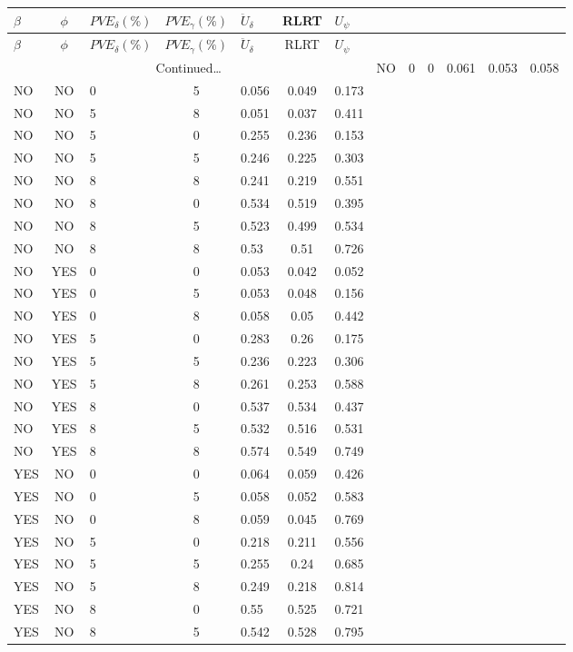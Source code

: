 \documentclass[hidelinks]{article}
\begin{document}
\begin{longtable}{lclclclclclc|c|}
\hline
$\beta$ & $\phi$  & $PVE_\delta (\%)$  & $PVE_\gamma (\%)$  &  $\ddot{U}_\delta$ & RLRT & $U_\psi$  \\ \hline
\endfirsthead
$\beta$ & $\phi$ & $PVE_\delta (\%)$  & $PVE_\gamma (\%)$  &  $\ddot{U}_\delta$ & RLRT & $U_\psi$  \\ \hline
\endhead
\multicolumn{7}{c}{{Continued\ldots}} \
\endfoot
\hline
\endlastfoot
NO & NO & 0 & 0 & 0.061 & 0.053 & 0.058 \\
NO & NO & 0 & 5 & 0.056 & 0.049 & 0.173 \\
NO & NO & 5 & 8 & 0.051 & 0.037 & 0.411 \\
NO & NO & 5 & 0 & 0.255 & 0.236 & 0.153 \\
NO & NO & 5 & 5 & 0.246 & 0.225 & 0.303 \\
NO & NO & 8 & 8 & 0.241 & 0.219 & 0.551 \\
NO & NO & 8 & 0 & 0.534 & 0.519 & 0.395 \\
NO & NO & 8 & 5 & 0.523 & 0.499 & 0.534 \\
NO & NO & 8 & 8 & 0.53 & 0.51 & 0.726 \\ \hdashline
NO & YES & 0 & 0 & 0.053 & 0.042 & 0.052 \\
NO & YES & 0 & 5 & 0.053 & 0.048 & 0.156 \\
NO & YES & 0 & 8 & 0.058 & 0.05 & 0.442 \\
NO & YES & 5 & 0 & 0.283 & 0.26 & 0.175 \\
NO & YES & 5 & 5 & 0.236 & 0.223 & 0.306 \\
NO & YES & 5 & 8 & 0.261 & 0.253 & 0.588 \\
NO & YES & 8 & 0 & 0.537 & 0.534 & 0.437 \\
NO & YES & 8 & 5 & 0.532 & 0.516 & 0.531 \\
NO & YES & 8 & 8 & 0.574 & 0.549 & 0.749 \\ \hline
YES & NO & 0 & 0 & 0.064 & 0.059 & 0.426 \\
YES & NO & 0 & 5 & 0.058 & 0.052 & 0.583 \\
YES & NO & 0 & 8 & 0.059 & 0.045 & 0.769 \\
YES & NO & 5 & 0 & 0.218 & 0.211 & 0.556 \\
YES & NO & 5 & 5 & 0.255 & 0.24 & 0.685 \\
YES & NO & 5 & 8 & 0.249 & 0.218 & 0.814 \\
YES & NO & 8 & 0 & 0.55 & 0.525 & 0.721 \\
YES & NO & 8 & 5 & 0.542 & 0.528 & 0.795 \\

\end{longtable}
\end{document}
